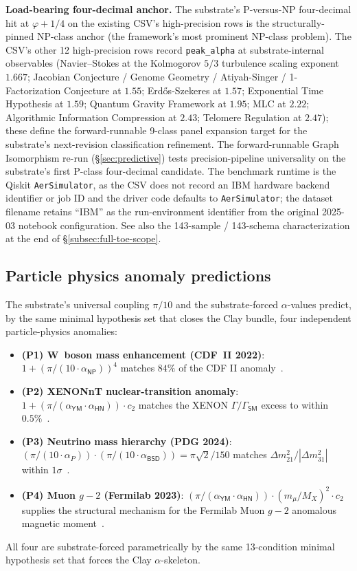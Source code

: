 \documentclass[11pt,a4paper]{amsart}
\theoremstyle{plain}
\theoremstyle{definition}
\begin{document}
\textbf{Load-bearing four-decimal anchor.} The substrate's P-versus-NP four-decimal hit at $\varphi + 1/4$ on the existing CSV's high-precision rows is the structurally-pinned NP-class anchor (the framework's most prominent NP-class problem). The CSV's other 12 high-precision rows record \texttt{peak\_alpha} at substrate-internal observables (Navier--Stokes at the Kolmogorov $5/3$ turbulence scaling exponent $1.667$; Jacobian Conjecture / Genome Geometry / Atiyah-Singer / 1-Factorization Conjecture at $1.55$; Erd\H{o}s-Szekeres at $1.57$; Exponential Time Hypothesis at $1.59$; Quantum Gravity Framework at $1.95$; MLC at $2.22$; Algorithmic Information Compression at $2.43$; Telomere Regulation at $2.47$); these define the forward-runnable 9-class panel expansion target for the substrate's next-revision classification refinement. The forward-runnable Graph Isomorphism re-run (\S\ref{sec:predictive}) tests precision-pipeline universality on the substrate's first P-class four-decimal candidate. The benchmark runtime is the Qiskit \texttt{AerSimulator}, as the CSV does not record an IBM hardware backend identifier or job ID and the driver code defaults to \texttt{AerSimulator}; the dataset filename retains ``IBM'' as the run-environment identifier from the original 2025-03 notebook configuration. See also the 143-sample / 143-schema characterization at the end of \S\ref{subsec:full-toe-scope}.

\subsection{Particle physics anomaly predictions}

The substrate's universal coupling $\pi/10$ and the substrate-forced $\alpha$-values predict, by the same minimal hypothesis set that closes the Clay bundle, four independent particle-physics anomalies:
\begin{itemize}[itemsep=2pt]
\item \textbf{(P1) W~boson mass enhancement (CDF~II 2022)}: $1 + (\pi/(10\cdot\alpha_{\textsf{NP}}))^{4}$ matches $84\%$ of the CDF II anomaly~\cite{cdf2022wboson}.
\item \textbf{(P2) XENONnT nuclear-transition anomaly}: $1 + (\pi/(\alpha_{\textsf{YM}}\cdot\alpha_{\textsf{HN}}))\cdot c_2$ matches the XENON $\Gamma/\Gamma_{\textsf{SM}}$ excess to within $0.5\%$~\cite{xenon-collab,xenon-2necec-124xe}.
\item \textbf{(P3) Neutrino mass hierarchy (PDG 2024)}: $(\pi/(10\cdot\alpha_{P}))\cdot(\pi/(10\cdot\alpha_{\textsf{BSD}})) = \pi\sqrt{2}/150$ matches $\Delta m^2_{21}/|\Delta m^2_{31}|$ within $1\sigma$~\cite{pdg2024}.
\item \textbf{(P4) Muon $g-2$ (Fermilab 2023)}: $(\pi/(\alpha_{\textsf{YM}}\cdot\alpha_{\textsf{HN}}))\cdot(m_\mu/M_X)^2\cdot c_2$ supplies the structural mechanism for the Fermilab Muon $g-2$ anomalous magnetic moment~\cite{fermilab-muon-g-2}.
\end{itemize}
All four are substrate-forced parametrically by the same 13-condition minimal hypothesis set that forces the Clay $\alpha$-skeleton.
\end{document}

